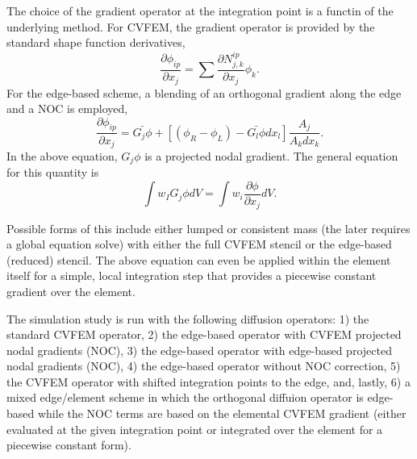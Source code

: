 The choice of the gradient operator at the integration point is a functin of the underlying method. For CVFEM,
the gradient operator is provided by the standard shape function derivatives,
\begin{equation}
 \frac{\partial \phi_{ip}}{\partial x_j} = \sum \frac{\partial N^{ip}_{j,k}} {\partial x_j} \phi_k.
\label{cvfemDerivative}
\end{equation}
For the edge-based scheme, a blending of an orthogonal gradient along the edge and a NOC is employed,
\begin{equation}
  \frac{\partial \phi_{ip}}{\partial x_j} = \bar{G_j\phi} + \left[ \left(\phi_R - \phi_L \right) 
- \bar{G_l\phi}dx_l \right] \frac{A_j}{A_k dx_k}.
\end{equation}
\label{generalGrad}
In the above equation, $G_j\phi$ is a projected nodal gradient. The general equation for this quantity is 
\begin{equation}
\int w_I G_j \phi {dV} = \int w_i \frac{\partial \phi}{\partial x_j}{dV}.
\label{PNG}
\end{equation}

Possible forms of this include either lumped or consistent mass (the later requires a global equation solve) with
either the full CVFEM stencil or the edge-based (reduced) stencil. The above equation can even be applied within 
the element itself for a simple, local integration step that provides a piecewise constant gradient over the element.

The simulation study is run with the following diffusion operators: 1) the standard CVFEM operator, 2) the edge-based
operator with CVFEM projected nodal gradients (NOC), 3) the edge-based operator with edge-based projected nodal gradients (NOC),
4) the edge-based operator without NOC correction, 5) the CVFEM operator with shifted integration points to the edge, and, lastly, 
6) a mixed edge/element scheme in which the orthogonal diffuion operator is edge-based while the NOC terms are based on the elemental 
CVFEM gradient (either evaluated at the given integration point or integrated over the element for a piecewise constant form).

